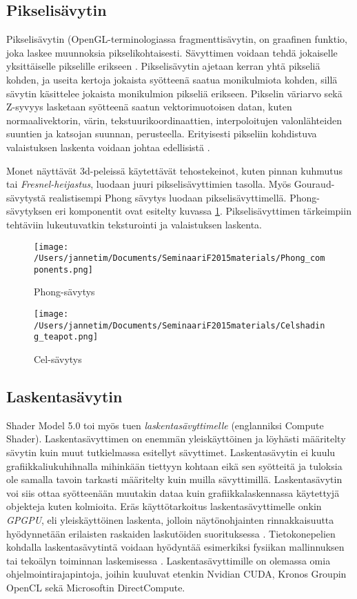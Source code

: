 \documentclass[finnish]{tktltiki2}
\theoremstyle{definition}
\theoremstyle{remark}
\begin{document}
\subsection{Pikselisävytin}

Pikselisävytin (OpenGL-terminologiassa fragmenttisävytin, on graafinen funktio, joka laskee muunnoksia pikselikohtaisesti. Sävyttimen voidaan tehdä jokaiselle yksittäiselle pikselille erikseen \cite{}. Pikselisävytin ajetaan kerran yhtä pikseliä kohden, ja useita kertoja jokaista syötteenä saatua monikulmiota kohden, sillä sävytin käsittelee jokaista monikulmion pikseliä erikseen. Pikselin väriarvo sekä Z-syvyys lasketaan syötteenä saatun vektorimuotoisen datan, kuten normaalivektorin, värin, tekstuurikoordinaattien, interpoloitujen valonlähteiden suuntien ja katsojan suunnan, perusteella. Erityisesti pikseliin kohdistuva valaistuksen laskenta voidaan johtaa edellisistä \cite{Puh08}.

Monet näyttävät 3d-peleissä käytettävät tehostekeinot, kuten pinnan kuhmutus tai \emph{Fresnel-heijastus}, luodaan juuri pikselisävyttimien tasolla. Myös Gouraud-sävytystä realistisempi Phong sävytys luodaan pikselisävyttimellä. Phong-sävytyksen eri komponentit ovat esitelty kuvassa \ref{Phong}. Pikselisävyttimen tärkeimpiin tehtäviin lukeutuvatkin teksturointi ja valaistuksen laskenta.

\begin{figure}[!htbp]
\texttt{[image: /Users/jannetim/Documents/SeminaariF2015materials/Phong\_components.png]}
\caption{Phong-sävytys}
\label{Phong}
\end{figure}

\begin{figure}[!htbp]
\texttt{[image: /Users/jannetim/Documents/SeminaariF2015materials/Celshading\_teapot.png]}
\caption{Cel-sävytys}
\label{Cel}
\end{figure}

\subsection{Laskentasävytin}

Shader Model 5.0 toi myös tuen \emph{laskentasävyttimelle} (englanniksi Compute Shader). Laskentasävyttimen on enemmän yleiskäyttöinen ja löyhästi määritelty sävytin kuin muut tutkielmassa esitellyt sävyttimet. Laskentasävytin ei kuulu grafiikkaliukuhihnalla mihinkään tiettyyn kohtaan eikä sen syötteitä ja tuloksia ole samalla tavoin tarkasti määritelty kuin muilla sävyttimillä. Laskentasävytin voi siis ottaa syötteenään muutakin dataa kuin grafiikkalaskennassa käytettyjä objekteja kuten kolmioita. Eräs käyttötarkoitus laskentasävyttimelle onkin \emph{GPGPU}, eli yleiskäyttöinen laskenta, jolloin näytönohjainten rinnakkaisuutta hyödynnetään erilaisten raskaiden laskutöiden suorituksessa \cite{Uni15}. Tietokonepelien kohdalla laskentasävytintä voidaan hyödyntää esimerkiksi fysiikan mallinnuksen tai tekoälyn toiminnan laskemisessa \cite[Luku: Compute Shader Overview]{Mic11}. Laskentasävyttimille on olemassa omia ohjelmointirajapintoja, joihin kuuluvat etenkin Nvidian CUDA, Kronos Groupin OpenCL sekä Microsoftin DirectCompute.
\end{document}
